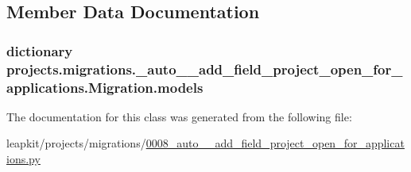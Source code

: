 \subsection{Member Data Documentation}
\hypertarget{classprojects_1_1migrations_1_10008__auto____add__field__project__open__for__applications_1_1_migration_a5dc94fc09944583c3e5710dcaf6eee92}{
\subsubsection[{models}]{\setlength{\rightskip}{0pt plus 5cm}dictionary projects.\-migrations.\-\_\-auto\-\_\-\-\_\-add\-\_\-field\-\_\-project\-\_\-open\-\_\-for\-\_\-applications.\-Migration.\-models\hspace{0.3cm}{\ttfamily [static]}}}\label{classprojects_1_1migrations_1_10008__auto____add__field__project__open__for__applications_1_1_migration_a5dc94fc09944583c3e5710dcaf6eee92}


The documentation for this class was generated from the following file\-:\begin{DoxyCompactItemize}
\item 
leapkit/projects/migrations/\hyperlink{0008__auto____add__field__project__open__for__applications_8py}{0008\-\_\-auto\-\_\-\-\_\-add\-\_\-field\-\_\-project\-\_\-open\-\_\-for\-\_\-applications.\-py}\end{DoxyCompactItemize}
